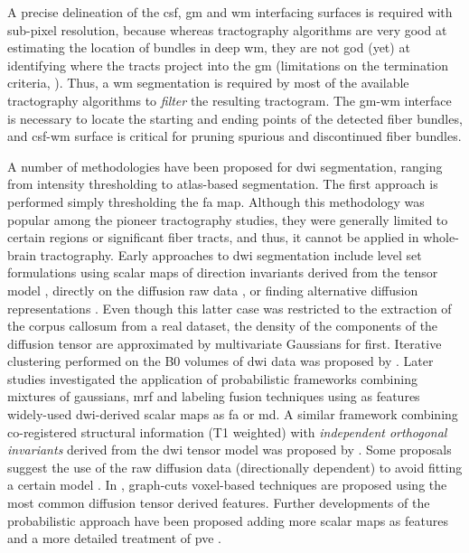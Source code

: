 A precise delineation of the \gls{csf}, \gls{gm} and \gls{wm} interfacing surfaces
is required with sub-pixel resolution, because whereas tractography algorithms are
very good at estimating the location of bundles in deep \gls{wm}, they are not
god (yet) at identifying where the tracts project into the \gls{gm} 
(limitations on the termination criteria, \citep{jbabdi_tractography:_2011,
craddock_imaging_2013}).
Thus, a \gls{wm} segmentation is required by most of the available tractography 
algorithms to \emph{filter} the resulting tractogram. The \gls{gm}-\gls{wm}
interface is necessary to locate the starting and ending points of the detected
fiber bundles, and \gls{csf}-\gls{wm} surface is critical for pruning spurious 
and discontinued fiber bundles.

A number of methodologies have been proposed for \gls{dwi} segmentation, ranging 
from intensity thresholding to atlas-based segmentation. 
The first approach is performed simply thresholding the \gls{fa} map.
Although this methodology was popular among the pioneer tractography studies,
they were generally limited to certain regions or significant fiber tracts, and thus,
it cannot be applied in whole-brain tractography. Early approaches to \gls{dwi} segmentation 
include level set formulations using scalar maps of direction invariants derived
from the tensor model \citep{zhukov_level_2003}, directly on the diffusion raw data
\citep{rousson_level_2004}, or finding alternative diffusion representations 
\citep{jonasson_representing_2007}. Even though this latter case was restricted to the extraction of
the corpus callosum from a real dataset, the density of the components of the diffusion tensor
are approximated by multivariate Gaussians for first. Iterative clustering performed on the 
B0 volumes of \gls{dwi} data was proposed by \citep{hadjiprocopis_unbiased_2005}.
Later studies investigated the application of probabilistic frameworks combining mixtures of 
gaussians, \gls{mrf} and labeling fusion techniques \citep{liu_brain_2007} using as features 
widely-used \gls{dwi}-derived scalar maps as \gls{fa} or \gls{md}. A similar framework 
combining co-registered structural information (T1 weighted) with \emph{independent orthogonal 
invariants} derived from the \gls{dwi} tensor model was proposed by \citep{awate_multivariate_2008}. 
Some proposals suggest the use of the raw diffusion data (directionally dependent) to avoid fitting 
a certain model \citep{lu_segmentation_2008}. In \citep{han_experimental_2009}, graph-cuts 
voxel-based techniques are proposed using the most common diffusion tensor derived features.
Further developments of the probabilistic approach have been proposed adding more scalar maps
as features and a more detailed treatment of \gls{pve} \citep{kumazawa_partial_2010}.

